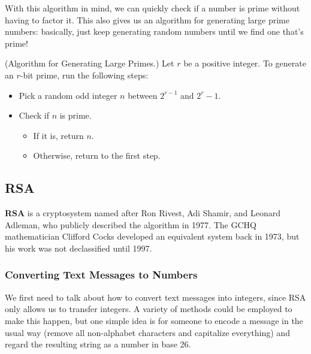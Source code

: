 \documentclass[letterpaper]{article}
\begin{document}
\bigskip 

With this algorithm in mind, we can quickly check if a number is prime without having to factor it. This also gives us an algorithm for generating large prime numbers: basically, just keep generating random numbers until we find one that's prime!
\begin{mdframed}
    (Algorithm for Generating Large Primes.) Let $r$ be a positive integer. To generate an $r$-bit prime, run the following steps: 
    \begin{itemize}
        \item Pick a random odd integer $n$ between $2^{r - 1}$ and $2^{r} - 1$. 
        \item Check if $n$ is prime. 
        \begin{itemize}
            \item If it is, return $n$. 
            \item Otherwise, return to the first step. 
        \end{itemize}
    \end{itemize}
\end{mdframed}

\subsection{RSA}
\textbf{RSA} is a cryptosystem named after Ron Rivest, Adi Shamir, and Leonard Adleman, who publicly described the algorithm in 1977. The GCHQ mathematician Clifford Cocks developed an equivalent system back in 1973, but his work was not declassified until 1997.

\subsubsection{Converting Text Messages to Numbers}
We first need to talk about how to convert text messages into integers, since RSA only allows us to transfer integers. A variety of methods could be employed to make this happen, but one simple idea is for someone to encode a message in the usual way (remove all non-alphabet characters and capitalize everything) and regard the resulting string as a number in base 26. 
\end{document}
